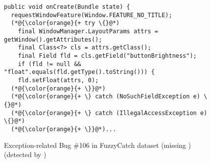 \begin{figure}[t]%
	\centering
\begin{lstlisting}[]
public void onCreate(Bundle state) {
  requestWindowFeature(Window.FEATURE_NO_TITLE);
  (*@{\color{orange}{+ try \{}@*)
    final WindowManager.LayoutParams attrs = getWindow().getAttributes();
    final Class<?> cls = attrs.getClass();
    final Field fld = cls.getField("buttonBrightness");
    if (fld != null && "float".equals(fld.getType().toString())) {
    fld.setFloat(attrs, 0);
  (*@{\color{orange}{+ \}}@*)
  (*@{\color{orange}{+ \} catch (NoSuchFieldException e) \{}@*)
  (*@{\color{orange}{+ \} catch (IllegalAccessException e) \{}@*)
  (*@{\color{orange}{+ \}}@*)...
\end{lstlisting}
        \vspace{-16pt}
        \caption{Exception-related Bug \#106 in FuzzyCatch dataset (missing ) (detected by {\tool})}
        \label{fig:example-bug}
\end{figure}
